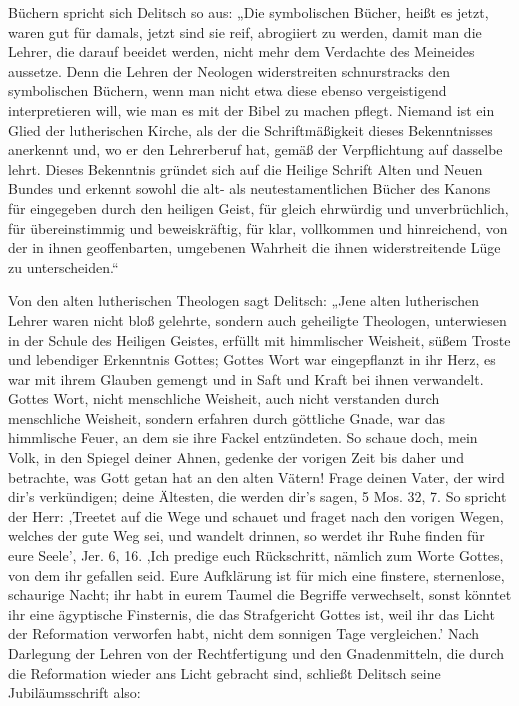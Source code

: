Büchern spricht sich Delitsch so aus: „Die symbolischen Bücher, heißt es jetzt, waren gut für damals, jetzt sind sie reif, abrogiiert zu werden, damit man die Lehrer, die darauf beeidet werden, nicht mehr dem Verdachte des Meineides aussetze. Denn die Lehren der Neologen widerstreiten schnurstracks den symbolischen Büchern, wenn man nicht etwa diese ebenso vergeistigend interpretieren will, wie man es mit der Bibel zu machen pflegt. Niemand ist ein Glied der lutherischen Kirche, als der die Schriftmäßigkeit dieses Bekenntnisses anerkennt und, wo er den Lehrerberuf hat, gemäß der Verpflichtung auf dasselbe lehrt. Dieses Bekenntnis gründet sich auf die Heilige Schrift Alten und Neuen Bundes und erkennt sowohl die alt- als neutestamentlichen Bücher des Kanons für eingegeben durch den heiligen Geist, für gleich ehrwürdig und unverbrüchlich, für übereinstimmig und beweiskräftig, für klar, vollkommen und hinreichend, von der in ihnen geoffenbarten, umgebenen Wahrheit die ihnen widerstreitende Lüge zu unterscheiden.“

Von den alten lutherischen Theologen sagt Delitsch: „Jene alten lutherischen Lehrer waren nicht bloß gelehrte, sondern auch geheiligte Theologen, unterwiesen in der Schule des Heiligen Geistes, erfüllt mit himmlischer Weisheit, süßem Troste und lebendiger Erkenntnis Gottes; Gottes Wort war eingepflanzt in ihr Herz, es war mit ihrem Glauben gemengt und in Saft und Kraft bei ihnen verwandelt. Gottes Wort, nicht menschliche Weisheit, auch nicht verstanden durch menschliche Weisheit, sondern erfahren durch göttliche Gnade, war das himmlische Feuer, an dem sie ihre Fackel entzündeten. So schaue doch, mein Volk, in den Spiegel deiner Ahnen, gedenke der vorigen Zeit bis daher und betrachte, was Gott getan hat an den alten Vätern! Frage deinen Vater, der wird dir’s verkündigen; deine Ältesten, die werden dir’s sagen, 5 Mos. 32, 7. So spricht der Herr: ,Treetet auf die Wege und schauet und fraget nach den vorigen Wegen, welches der gute Weg sei, und wandelt drinnen, so werdet ihr Ruhe finden für eure Seele', Jer. 6, 16. ,Ich predige euch Rückschritt, nämlich zum Worte Gottes, von dem ihr gefallen seid. Eure Aufklärung ist für mich eine finstere, sternenlose, schaurige Nacht; ihr habt in eurem Taumel die Begriffe verwechselt, sonst könntet ihr eine ägyptische Finsternis, die das Strafgericht Gottes ist, weil ihr das Licht der Reformation verworfen habt, nicht dem sonnigen Tage vergleichen.' Nach Darlegung der Lehren von der Rechtfertigung und den Gnadenmitteln, die durch die Reformation wieder ans Licht gebracht sind, schließt Delitsch seine Jubiläumsschrift also: